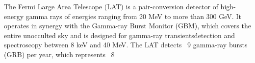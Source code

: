 


\bigskip



\bigskip

\noindent The Fermi Large Area Telescope (LAT) is a pair-conversion detector of high-energy gamma rays of energies ranging from 20 MeV to more than 300 GeV. It operates in synergy with the Gamma-ray Burst Monitor (GBM), which covers the entire unocculted sky and is designed for gamma-ray transients\' detection and spectroscopy between 8 keV and 40 MeV. The LAT detects ~9 gamma-ray bursts (GRB) per year, which represents ~8%

